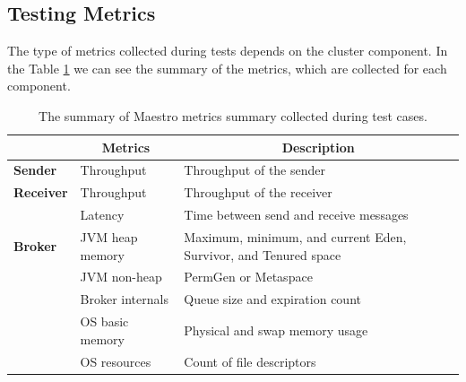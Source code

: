 


\subsection{Testing Metrics}
\label{Testing Metrics}
The type of metrics collected during tests depends on the cluster component. In the Table \ref{tab:maestro_metrics} we can see the summary of the metrics, which are collected for each component.

\begin{table}[H]
\centering
\caption{The summary of Maestro metrics summary collected during test cases.}
\begin{tabular}{|p{2.5cm}|p{3.5cm}|p{7cm}|}
\hline
\rowcolor[HTML]{C5E3DF}
\multicolumn{1}{|c|}{\textbf{Component}} & \multicolumn{1}{c|}{\textbf{Metrics}} & \multicolumn{1}{c|}{\textbf{Description}}                       \\ \hline
\textbf{Sender}                          & Throughput                            & Throughput of the sender                                        \\ \hline
\textbf{Receiver}                        & Throughput                            & Throughput of the receiver                                      \\ \hline
\textbf{}                                & Latency                               & Time between send and receive messages                           \\ \hline
\textbf{Broker}			                & JVM heap memory                       & Maximum, minimum, and current Eden, Survivor, and Tenured space\footnotemark{} \\ \hline
                                         & JVM non-heap                          & PermGen or Metaspace                                            \\ \hline
                                         & Broker internals                      & Queue size and expiration count                                 \\ \hline
                                         & OS basic memory                       & Physical and swap memory usage                                  \\ \hline
                                         & OS resources                          & Count of file descriptors                                       \\ \hline
\end{tabular}
\label{tab:maestro_metrics}
\end{table}

